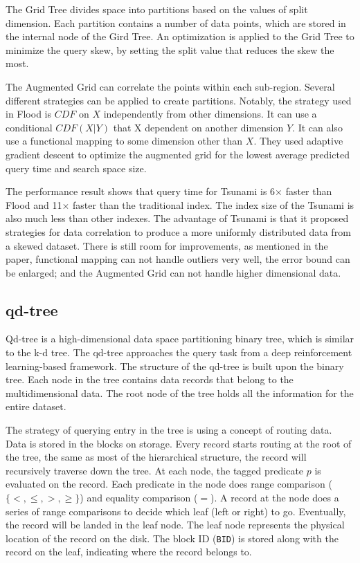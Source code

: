 The Grid Tree divides space into partitions based on the values of split dimension. Each partition contains a number of data points, which are stored in the internal node of the Gird Tree. An optimization is applied to the Grid Tree to minimize the query skew, by setting the split value that reduces the skew the most. 

The Augmented Grid can correlate the points within each sub-region. Several different strategies can be applied to create partitions. Notably, the strategy used in Flood is $CDF$ on $X$ independently from other dimensions. It can use a conditional $CDF(X|Y)$ that X dependent on another dimension $Y$. It can also use a functional mapping to some dimension other than $X$. They used adaptive gradient descent to optimize the augmented grid for the lowest average predicted query time and search space size. 

The performance result shows that query time for Tsunami is 6$\times$ faster than Flood and 11$\times$ faster than the traditional index. The index size of the Tsunami is also much less than other indexes. The advantage of Tsunami is that it proposed strategies for data correlation to produce a more uniformly distributed data from a skewed dataset. There is still room for improvements, as mentioned in the paper, functional mapping can not handle outliers very well, the error bound can be enlarged; and the Augmented Grid can not handle higher dimensional data. 

\subsection{qd-tree}
Qd-tree \cite{Yang:2020ev} is a high-dimensional data space partitioning binary tree, which is similar to the k-d tree. The qd-tree approaches the query task from a deep reinforcement learning-based framework. The structure of the qd-tree is built upon the binary tree. Each node in the tree contains data records that belong to the multidimensional data. The root node of the tree holds all the information for the entire dataset. 

The strategy of querying entry in the tree is using a concept of routing data. Data is stored in the blocks on storage. Every record starts routing at the root of the tree, the same as most of the hierarchical structure, the record will recursively traverse down the tree. At each node, the tagged predicate $p$ is evaluated on the record. Each predicate in the node does range comparison ($\{<, \leq, >, \geq\}$) and equality comparison ($=$). A record at the node does a series of range comparisons to decide which leaf (left or right) to go.  Eventually, the record will be landed in the leaf node. The leaf node represents the physical location of the record on the disk. The block ID (\texttt{BID}) is stored along with the record on the leaf, indicating where the record belongs to. 

